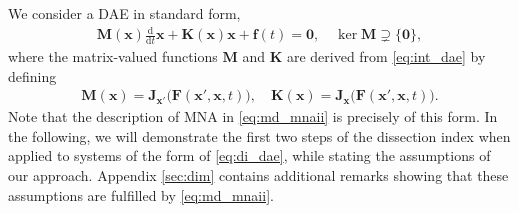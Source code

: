 \documentclass[AMA,STIX1COL]{WileyNJD-v2}
\newcommand{\mb}[1]{\mathbf{#1}}
\newcommand{\ddt}{\frac{\mathrm{d}}{\mathrm{d}t}}
\begin{document}
We consider a DAE in standard form\cite{jansen2014},
\begin{align}
    \mb{M}(\mb{x}) \ddt \mb{x} + \mb{K}(\mb{x}) \mb{x} + \mb{f}(t) = \mb{0}, \quad \ker \mb{M} \supsetneq \{ \mb{0} \}, \label{eq:di_dae}
\end{align}
where the matrix-valued functions $\mb{M}$ and $\mb{K}$ are derived from \eqref{eq:int_dae} by defining
\begin{align*}
    \mb{M}(\mb{x}) = \mb{J}_{\mb{x}'} \big( \mb{F}(\mb{x}', \mb{x}, t) \big), \quad \mb{K}(\mb{x}) = \mb{J}_{\mb{x}} \big( \mb{F}(\mb{x}', \mb{x}, t) \big).
\end{align*}
Note that the description of MNA in \eqref{eq:md_mnaii} is precisely of this form. In the following, we will demonstrate the first two steps of the dissection index when applied to systems of the form of \eqref{eq:di_dae}, while stating the assumptions of our approach. Appendix \autoref{sec:dim} contains additional remarks showing that these assumptions are fulfilled by \eqref{eq:md_mnaii}.
\end{document}
